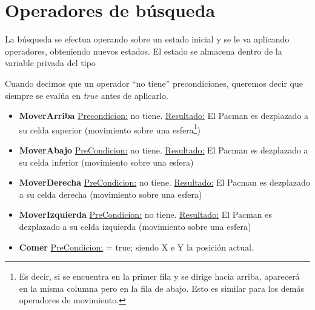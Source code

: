 \section{Operadores de búsqueda}

La búsqueda se efectua operando sobre un estado inicial y se le va aplicando
operadores, obteniendo nuevos estados. El estado se almacena dentro de
la variable privada  del tipo 

Cuando decimos que un operador ``no tiene'' precondiciones, queremos decir
que siempre se evalúa en \emph{true} antes de aplicarlo.

\begin{itemize}

\item \textbf{MoverArriba}\newline
\underline{Precondicion:} no tiene.\newline
\underline{Resultado:} El Pacman es dezplazado a su celda superior (movimiento
sobre una esfera\footnote{Es decir, si se encuentra en la primer fila y se
dirige hacia arriba, aparecerá en la misma columna pero en la fila de abajo.
Esto es similar para los demás operadores de movimiento.})

\item \textbf{MoverAbajo}\newline
\underline{PreCondicion:} no tiene.\newline
\underline{Resultado:} El Pacman es dezplazado a su celda inferior (movimiento
sobre una esfera)\newline

\item \textbf{MoverDerecha}\newline
\underline{PreCondicion:} no tiene.\newline
\underline{Resultado:} El Pacman es dezplazado a su celda derecha (movimiento
sobre una esfera)\newline

\item \textbf{MoverIzquierda}\newline
\underline{PreCondicion:} no tiene.\newline
\underline{Resultado:} El Pacman es dezplazado a su celda izquierda (movimiento
sobre una esfera)\newline

\item \textbf{Comer}\newline
\underline{PreCondicion:}  = true;
siendo X e Y la posición actual.


\end{itemize}
